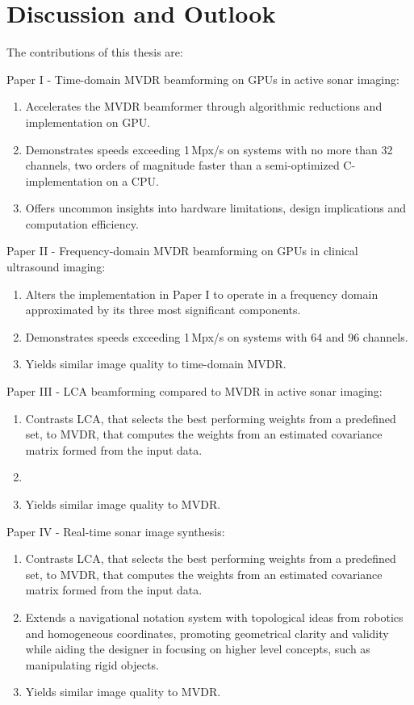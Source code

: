 
\endofdump

\ifRootBuild\else
  
  \makeglossaries
\fi



\chapter{Discussion and Outlook}

The contributions of this thesis are:

Paper I - Time-domain MVDR beamforming on GPUs in active sonar imaging:
\begin{enumerate}
\item Accelerates the MVDR beamformer through algorithmic reductions and implementation on GPU.
\item Demonstrates speeds exceeding 1\,Mpx/s on systems with no more than 32 channels, two orders of magnitude faster than a semi-optimized C-implementation on a CPU.
\item Offers uncommon insights into hardware limitations, design implications and computation efficiency.
\end{enumerate}

Paper II - Frequency-domain MVDR beamforming on GPUs in clinical ultrasound imaging:
\begin{enumerate}
\item Alters the implementation in Paper I to operate in a frequency domain approximated by its three most significant components.
\item Demonstrates speeds exceeding 1\,Mpx/s on systems with 64 and 96 channels.
\item Yields similar image quality to time-domain MVDR.
\end{enumerate}

Paper III - LCA beamforming compared to MVDR in active sonar imaging:
\begin{enumerate}
\item Contrasts LCA, that selects the best performing weights from a predefined set, to MVDR, that computes the weights from an estimated covariance matrix formed from the input data.
\item 
\item Yields similar image quality to MVDR.
\end{enumerate}

Paper IV - Real-time sonar image synthesis:
\begin{enumerate}
\item Contrasts LCA, that selects the best performing weights from a predefined set, to MVDR, that computes the weights from an estimated covariance matrix formed from the input data.
\item Extends a navigational notation system with topological ideas from robotics and homogeneous coordinates, promoting geometrical clarity and validity while aiding the designer in focusing on higher level concepts, such as manipulating rigid objects.
\item Yields similar image quality to MVDR.
\end{enumerate}



